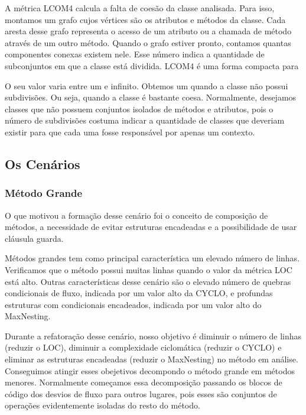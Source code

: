 	A métrica LCOM4 \citep{HM96} calcula a falta de coesão da classe analisada. Para isso, montamos um grafo cujos vértices são os atributos e métodos da classe. Cada aresta desse grafo representa o acesso de um atributo ou a chamada de método através de um outro método. Quando o grafo estiver pronto, contamos quantas componentes conexas existem nele. Esse número indica a quantidade de subconjuntos em que a classe está dividida. LCOM4 é uma forma compacta para 
	
	O seu valor varia entre um e infinito. Obtemos um quando a classe não possui subdivisões. Ou seja, quando a classe é bastante coesa. Normalmente, desejamos classes que não possuem conjuntos isolados de métodos e atributos, pois o número de subdivisões costuma indicar a quantidade de classes que deveriam existir para que cada uma fosse responsável por apenas um contexto.
	     

	  

\subsection{Os Cenários}

\subsubsection{Método Grande}
	
	O que motivou a formação desse cenário foi o conceito de composição de métodos, a necessidade de evitar estruturas encadeadas e a possibilidade de usar cláusula guarda.
	
	Métodos grandes tem como principal característica um elevado número de linhas. Verificamos que o método possui muitas linhas quando o valor da métrica LOC está alto. Outras características desse cenário são o elevado número de quebras condicionais de fluxo, indicada por um valor alto da CYCLO, e profundas estruturas com condicionais encadeados, indicada por um valor alto do MaxNesting. 
	
	Durante a refatoração desse cenário, nosso objetivo é diminuir o número de linhas (reduzir o LOC), diminuir a complexidade ciclomática (reduzir o CYCLO) e eliminar as estruturas encadeadas (reduzir o MaxNesting) no método em análise. Conseguimos atingir esses obejetivos decompondo o método grande em métodos menores. Normalmente começamos essa decomposição passando os blocos de código dos desvios de fluxo para outros lugares, pois esses são conjuntos de operações evidentemente isoladas do resto do método.
	
